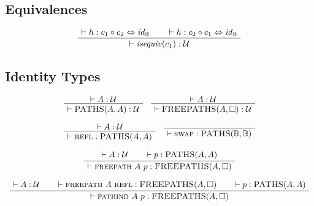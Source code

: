 \documentclass[format=acmlarge,review,natbib]{acmart}
\newcommand{\patht}[1]{\textsc{PATHS}(#1,#1)}
\newcommand{\fpatht}[1]{\textsc{FREEPATHS}(#1,\Box)}
\newcommand{\fpathp}[2]{\textsc{freepath}~#1~#2}
\newcommand{\pathind}[2]{\textsc{pathind}~#1~#2}
\newcommand{\compc}{\circ}
\newcommand{\reflp}{\textsc{refl}}
\newcommand{\swapp}{\textsc{swap}}
\newcommand{\isequiv}[1]{\mathit{isequiv}(#1)}
\newcommand{\idc}{\mathit{id}_{\boolt}}
\newcommand{\isotwo}{\Leftrightarrow}
\newcommand{\boolt}{\mathbb{B}}
\newcommand{\univ}{\mathcal{U}}
\newcommand{\proves}{\vdash}
\newcommand{\jdg}[2]{\proves #1 : #2}
\begin{document}
\subsection{Equivalences}

\[\begin{array}{c}
  \AxiomC{$\jdg{h}{c_1\compc c_2 \isotwo \idc}$}
  \AxiomC{$\jdg{h}{c_2\compc c_1 \isotwo \idc}$}
  \BinaryInfC{$\jdg{\isequiv{c_1}}{\univ}$}
  \DisplayProof
\end{array}\]

\subsection{Identity Types}

\[\begin{array}{c}
  \AxiomC{$\jdg{A}{\univ}$}
  \UnaryInfC{$\jdg{\patht{A}}{\univ}$}
  \DisplayProof
\quad
  \AxiomC{$\jdg{A}{\univ}$}
  \UnaryInfC{$\jdg{\fpatht{A}}{\univ}$}
  \DisplayProof
\\
\\
  \AxiomC{$\jdg{A}{\univ}$}
  \UnaryInfC{$\jdg{\reflp}{\patht{A}}$}
  \DisplayProof
\quad
  \AxiomC{}
  \UnaryInfC{$\jdg{\swapp}{\patht{\boolt}}$}
  \DisplayProof
\\
\\
  \AxiomC{$\jdg{A}{\univ}$}
  \AxiomC{$\jdg{p}{\patht{A}}$}
  \BinaryInfC{$\jdg{\fpathp{A}{p}}{\fpatht{A}}$}
  \DisplayProof
\\
\\
  \AxiomC{$\jdg{A}{\univ}$}
  \AxiomC{$\jdg{\fpathp{A}{\reflp}}{\fpatht{A}}$}
  \AxiomC{$\jdg{p}{\patht{A}}$}
  \TrinaryInfC{$\jdg{\pathind{A}{p}}{\fpatht{A}}$}
  \DisplayProof
\end{array}\]

\newpage
\end{document}
